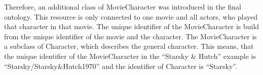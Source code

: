 Therefore, an additional class of MovieCharacter was introduced in the final ontology.
This resource is only connected to one movie and all actors, who played that character in that movie.
The unique identifier of the MovieCharacter is build from the unique identifier of the movie and the character.
The MovieCharacter is a subclass of Character, which describes the general character.
This means, that the unique identifier of the MovieCharacter in the ``Starsky \& Hutch'' example is ``Starsky/Starsky\&Hutch1970'' and the identifier of Character is ``Starsky''.